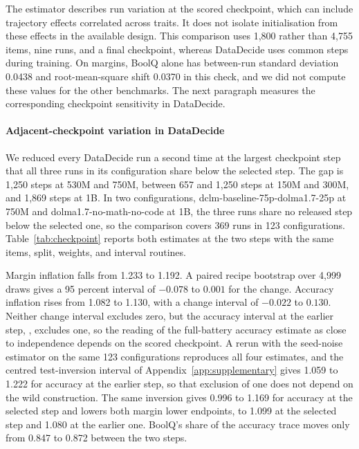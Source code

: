 The estimator describes run variation at the scored checkpoint, which can include trajectory effects correlated across traits. It does not isolate initialisation from these effects in the available design. This comparison uses 1,800 rather than 4,755 items, nine runs, and a final checkpoint, whereas DataDecide uses common steps during training. On margins, BoolQ alone has between-run standard deviation 0.0438 and root-mean-square shift 0.0370 in this check, and we did not compute these values for the other benchmarks. The next paragraph measures the corresponding checkpoint sensitivity in DataDecide.

\paragraph{Adjacent-checkpoint variation in DataDecide}
\label{app:checkpoint}
We reduced every DataDecide run a second time at the largest checkpoint step that all three runs in its configuration share below the selected step. The gap is 1,250 steps at 530M and 750M, between 657 and 1,250 steps at 150M and 300M, and 1,869 steps at 1B. In two configurations, dclm-baseline-75p-dolma1.7-25p at 750M and dolma1.7-no-math-no-code at 1B, the three runs share no released step below the selected one, so the comparison covers 369 runs in 123 configurations. Table~\ref{tab:checkpoint} reports both estimates at the two steps with the same items, split, weights, and interval routines.

Margin inflation falls from 1.233 to 1.192. A paired recipe bootstrap over 4,999 draws gives a 95 percent interval of $-0.078$ to $0.001$ for the change. Accuracy inflation rises from 1.082 to 1.130, with a change interval of $-0.022$ to $0.130$. Neither change interval excludes zero, but the accuracy interval at the earlier step, , excludes one, so the reading of the full-battery accuracy estimate as close to independence depends on the scored checkpoint. A rerun with the seed-noise estimator on the same 123 configurations reproduces all four estimates, and the centred test-inversion interval of Appendix~\ref{app:supplementary} gives 1.059 to 1.222 for accuracy at the earlier step, so that exclusion of one does not depend on the wild construction. The same inversion gives 0.996 to 1.169 for accuracy at the selected step and lowers both margin lower endpoints, to 1.099 at the selected step and 1.080 at the earlier one. BoolQ's share of the accuracy trace moves only from 0.847 to 0.872 between the two steps.

